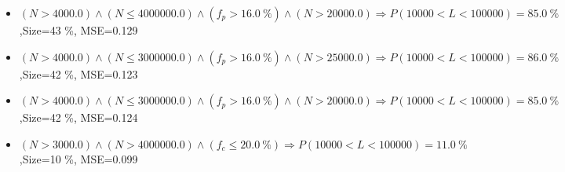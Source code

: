 \documentclass[numbered]{CSL}
\begin{document}
\begin{itemize}
\item $(N > 4000.0) \land (N \leq 4000000.0) \land (f_p > 16.0~\%) \land (N > 20000.0) \Rightarrow P(10 000 < L < 100 000) = 85.0~\%$,\hfill Size=43 \%, MSE=0.129
\item $(N > 4000.0) \land (N \leq 3000000.0) \land (f_p > 16.0~\%) \land (N > 25000.0) \Rightarrow P(10 000 < L < 100 000) = 86.0~\%$,\hfill Size=42 \%, MSE=0.123
\item $(N > 4000.0) \land (N \leq 3000000.0) \land (f_p > 16.0~\%) \land (N > 20000.0) \Rightarrow P(10 000 < L < 100 000) = 85.0~\%$,\hfill Size=42 \%, MSE=0.124
\item $(N > 3000.0) \land (N > 4000000.0) \land (f_c \leq 20.0~\%) \Rightarrow P(10 000 < L < 100 000) = 11.0~\%$,\hfill Size=10 \%, MSE=0.099
\end{itemize}
\end{document}
